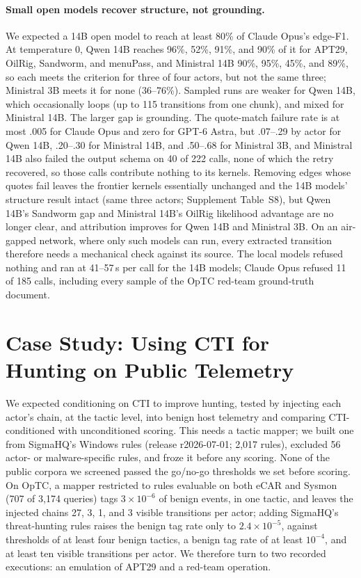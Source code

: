 \documentclass[letterpaper]{article}
\begin{document}
\paragraph{Small open models recover structure, not grounding.} We expected a 14B open model to reach at least 80\% of Claude Opus's edge-F1. At temperature 0, Qwen 14B reaches 96\%, 52\%, 91\%, and 90\% of it for APT29, OilRig, Sandworm, and menuPass, and Ministral 14B 90\%, 95\%, 45\%, and 89\%, so each meets the criterion for three of four actors, but not the same three; Ministral 3B meets it for none (36--76\%). Sampled runs are weaker for Qwen 14B, which occasionally loops (up to 115 transitions from one chunk), and mixed for Ministral 14B. The larger gap is grounding. The quote-match failure rate is at most .005 for Claude Opus and zero for GPT-6 Astra, but .07--.29 by actor for Qwen 14B, .20--.30 for Ministral 14B, and .50--.68 for Ministral 3B, and Ministral 14B also failed the output schema on 40 of 222 calls, none of which the retry recovered, so those calls contribute nothing to its kernels. Removing edges whose quotes fail leaves the frontier kernels essentially unchanged and the 14B models' structure result intact (same three actors; Supplement Table~S8), but Qwen 14B's Sandworm gap and Ministral 14B's OilRig likelihood advantage are no longer clear, and attribution improves for Qwen 14B and Ministral 3B. On an air-gapped network, where only such models can run, every extracted transition therefore needs a mechanical check against its source. The local models refused nothing and ran at 41--57\,s per call for the 14B models; Claude Opus refused 11 of 185 calls, including every sample of the OpTC red-team ground-truth document.

\section{Case Study: Using CTI for Hunting on Public Telemetry}

We expected conditioning on CTI to improve hunting, tested by injecting each actor's chain, at the tactic level, into benign host telemetry and comparing CTI-conditioned with unconditioned scoring. This needs a tactic mapper; we built one from SigmaHQ's Windows rules \citep{sigmahq} (release r2026-07-01; 2,017 rules), excluded 56 actor- or malware-specific rules, and froze it before any scoring. None of the public corpora we screened passed the go/no-go thresholds we set before scoring. On OpTC, a mapper restricted to rules evaluable on both eCAR and Sysmon (707 of 3,174 queries) tags $3\times10^{-6}$ of benign events, in one tactic, and leaves the injected chains 27, 3, 1, and 3 visible transitions per actor; adding SigmaHQ's threat-hunting rules raises the benign tag rate only to $2.4\times10^{-5}$, against thresholds of at least four benign tactics, a benign tag rate of at least $10^{-4}$, and at least ten visible transitions per actor. We therefore turn to two recorded executions: an emulation of APT29 and a red-team operation.
\end{document}
